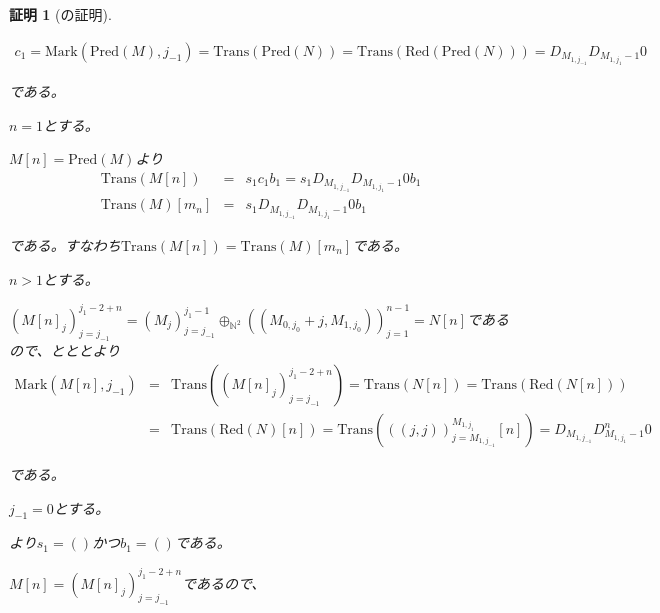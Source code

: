 \documentclass[dvipdfmx,uplatex]{jsarticle}
\theoremstyle{customnonumberbreakfortheorem}
\theoremstyle{customnonumberbreakforproof}
\newtheorem{hideableproof}{証明}
\begin{document}
\begin{hideableproof}[の証明]
\begin{indented}
\begin{indented}
			\begin{eqnarray*}
			c_1 = \textrm{Mark}(\textrm{Pred}(M),j_{-1}) = \textrm{Trans}(\textrm{Pred}(N)) = \textrm{Trans}(\textrm{Red}(\textrm{Pred}(N))) = D_{M_{1,j_{-1}}} D_{M_{1,j_1}-1} 0
			\end{eqnarray*}
		\end{indented}
		\item である。
		\item \(n = 1\)とする。
		\begin{indented}
			\item
			\begin{indented}
				\item \(M[n] = \textrm{Pred}(M)\)より
				\begin{eqnarray*}
				\textrm{Trans}(M[n]) & = & s_1 c_1 b_1 = s_1 D_{M_{1,j_{-1}}} D_{M_{1,j_1}-1} 0 b_1 \\
				\textrm{Trans}(M)[m_n] & = & s_1 D_{M_{1,j_{-1}}} D_{M_{1,j_1}-1} 0 b_1
				\end{eqnarray*}
				\item である。すなわち\(\textrm{Trans}(M[n]) = \textrm{Trans}(M)[m_n]\)である。
			\end{indented}
			\item \(n > 1\)とする。
			\begin{indented}
				\item \((M[n]_j)_{j=j_{-1}}^{j_1-2+n} = (M_j)_{j=j_{-1}}^{j_1-1} \oplus_{\mathbb{N}^2} ((M_{0,j_0}+j,M_{1,j_0}))_{j=1}^{n-1} = N[n]\)であるので、とととより
				\begin{eqnarray*}
				\textrm{Mark}(M[n],j_{-1}) & = & \textrm{Trans}((M[n]_j)_{j=j_{-1}}^{j_1-2+n}) = \textrm{Trans}(N[n]) = \textrm{Trans}(\textrm{Red}(N[n])) \\
				& = & \textrm{Trans}(\textrm{Red}(N)[n]) = \textrm{Trans}(((j,j))_{j=M_{1,j_{-1}}}^{M_{1,j_1}}[n]) = D_{M_{1,j_{-1}}} D_{M_{1,j_1}-1}^n 0
				\end{eqnarray*}
				\item である。
				\item \(j_{-1} = 0\)とする。
				\begin{indented}
					\item {}より\(s_1 = ()\)かつ\(b_1 = ()\)である。
					\item \(M[n] = (M[n]_j)_{j=j_{-1}}^{j_1-2+n}\)であるので、
					\begin{eqnarray*}

\end{eqnarray*}
\end{indented}
\end{indented}
\end{indented}
\end{indented}
\end{hideableproof}
\end{document}
